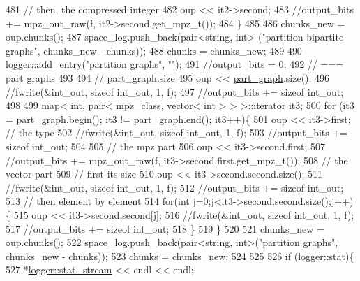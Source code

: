 \begin{DoxyCode}
481     \textcolor{comment}{// then, the compressed integer}
482     oup << it2->second;
483     \textcolor{comment}{//output\_bits += mpz\_out\_raw(f, it2->second.get\_mpz\_t());}
484   \}
485 
486   chunks\_new = oup.chunks();
487   space\_log.push\_back(pair<string, int> (\textcolor{stringliteral}{"partition bipartite graphs"}, chunks\_new - chunks));
488   chunks = chunks\_new;
489 
490   \hyperlink{classlogger_a710163deb17bc81f70d53d285b8ac9ac}{logger::add\_entry}(\textcolor{stringliteral}{"partition graphs"}, \textcolor{stringliteral}{""});
491   \textcolor{comment}{//output\_bits = 0;}
492   \textcolor{comment}{// === part graphs}
493 
494   \textcolor{comment}{// part\_graph.size}
495   oup <<  \hyperlink{classmarked__graph__compressed_ae179a4737e6eab905c18a94d44ef64b7}{part\_graph}.size();
496   \textcolor{comment}{//fwrite(&int\_out, sizeof int\_out, 1, f);}
497   \textcolor{comment}{//output\_bits += sizeof int\_out;}
498 
499   map< int, pair< mpz\_class, vector< int > > >::iterator it3;
500   \textcolor{keywordflow}{for} (it3 = \hyperlink{classmarked__graph__compressed_ae179a4737e6eab905c18a94d44ef64b7}{part\_graph}.begin(); it3 != \hyperlink{classmarked__graph__compressed_ae179a4737e6eab905c18a94d44ef64b7}{part\_graph}.end(); it3++)\{
501     oup <<  it3->first; \textcolor{comment}{// the type}
502     \textcolor{comment}{//fwrite(&int\_out, sizeof int\_out, 1, f);}
503     \textcolor{comment}{//output\_bits += sizeof int\_out;}
504 
505     \textcolor{comment}{// the mpz part}
506     oup << it3->second.first;
507     \textcolor{comment}{//output\_bits += mpz\_out\_raw(f, it3->second.first.get\_mpz\_t());}
508     \textcolor{comment}{// the vector part}
509     \textcolor{comment}{// first its size}
510     oup <<  it3->second.second.size();
511     \textcolor{comment}{//fwrite(&int\_out, sizeof int\_out, 1, f);}
512     \textcolor{comment}{//output\_bits += sizeof int\_out;}
513     \textcolor{comment}{// then element by element}
514     \textcolor{keywordflow}{for}(\textcolor{keywordtype}{int} j=0;j<it3->second.second.size();j++)\{
515       oup <<  it3->second.second[j];
516       \textcolor{comment}{//fwrite(&int\_out, sizeof int\_out, 1, f);}
517       \textcolor{comment}{//output\_bits += sizeof int\_out;}
518     \}
519   \}
520 
521   chunks\_new = oup.chunks();
522   space\_log.push\_back(pair<string, int>(\textcolor{stringliteral}{"partition graphs"}, chunks\_new - chunks));
523   chunks = chunks\_new;
524 
525   
526   \textcolor{keywordflow}{if} (\hyperlink{classlogger_a26812b5ba03f130e8dae3446d5fc032f}{logger::stat})\{
527     *\hyperlink{classlogger_a7db37821f875f2ba3540980b355779f5}{logger::stat\_stream} << endl << endl;

\end{DoxyCode}
